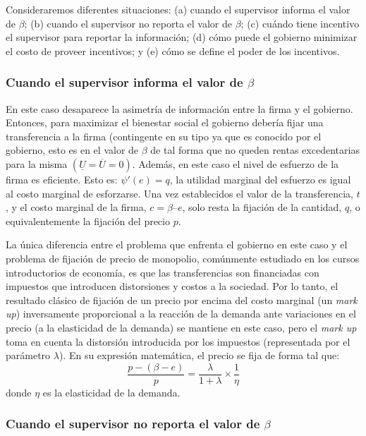 \documentclass[
  12pt,
  spanish,
]{book}
\begin{document}
Consideraremos diferentes situaciones: (a) cuando el supervisor informa
el valor de \(β\); (b) cuando el supervisor no reporta el valor de
\(β\); (c) cuándo tiene incentivo el supervisor para reportar la
información; (d) cómo puede el gobierno minimizar el costo de proveer
incentivos; y (e) cómo se define el poder de los incentivos.

\hypertarget{cuando-el-supervisor-informa-el-valor-de-beta}{%
\subsubsection{\texorpdfstring{Cuando el supervisor informa el valor de
\(\beta\)}{Cuando el supervisor informa el valor de \textbackslash beta}}\label{cuando-el-supervisor-informa-el-valor-de-beta}}

En este caso desaparece la asimetría de información entre la firma y el
gobierno. Entonces, para maximizar el bienestar social el gobierno
debería fijar una transferencia a la firma (contingente en su tipo ya
que es conocido por el gobierno, esto es en el valor de \(β\) de tal
forma que no queden rentas excedentarias para la misma
\((\underline U = \overline U=0)\). Además, en este caso el nivel de
esfuerzo de la firma es eficiente. Esto es: \(ψ′(e) = q\), la utilidad
marginal del esfuerzo es igual al costo marginal de esforzarse. Una vez
establecidos el valor de la transferencia, \(t\), y el costo marginal de
la firma, \(c = β – e\), solo resta la fijación de la cantidad, \(q\), o
equivalentemente la fijación del precio \(p\).

La única diferencia entre el problema que enfrenta el gobierno en este
caso y el problema de fijación de precio de monopolio, comúnmente
estudiado en los cursos introductorios de economía, es que las
transferencias son financiadas con impuestos que introducen distorsiones
y costos a la sociedad. Por lo tanto, el resultado clásico de fijación
de un precio por encima del costo marginal (un \emph{mark up})
inversamente proporcional a la reacción de la demanda ante variaciones
en el precio (a la elasticidad de la demanda) se mantiene en este caso,
pero el \emph{mark up} toma en cuenta la distorsión introducida por los
impuestos (representada por el parámetro \(λ\)). En su expresión
matemática, el precio se fija de forma tal que:
\[\frac{p-\left(\beta-e\right)}{p}=\frac{\lambda}{1+\lambda}\times\frac{1}{\eta}\]
donde \(η\) es la elasticidad de la demanda.

\hypertarget{cuando-el-supervisor-no-reporta-el-valor-de-ux3b2}{%
\subsubsection{\texorpdfstring{Cuando el supervisor no reporta el valor
de
\(β\)}{Cuando el supervisor no reporta el valor de β}}\label{cuando-el-supervisor-no-reporta-el-valor-de-ux3b2}}
\end{document}
